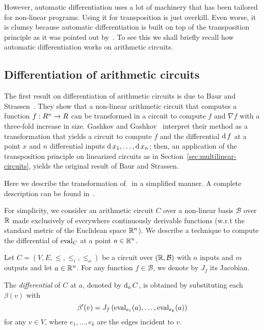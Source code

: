 However, automatic differentiation uses a lot of machinery that has
been tailored for non-linear programs. Using it for transposition is
just overkill. Even worse, it is clumsy because automatic
differentiation is built on top of the transposition principle as it
was pointed out by~\cite{gashkov+gashkov05}. To see this we shall
briefly recall how automatic differentiation works on arithmetic
circuits.

\subsection{Differentiation of arithmetic circuits}
\label{sec:diff-arithm-circ}
 The first
result on differentiation of arithmetic circuits is due to Baur and
Strassen~\cite{baur+strassen83}. They show that a non-linear
arithmetic circuit that computes a function $f:R^n\rightarrow R$ can be
transformed in a circuit to compute $f$ and $\nabla f$ with a
three-fold increase in size. Gashkov and
Gashkov~\cite{gashkov+gashkov05} interpret their method as a
transformation that yields a circuit to compute $f$ and the
differential $\operatorname{d} f$ at a point $x$ and $n$ differential inputs
$\operatorname{d} x_1,\ldots,\operatorname{d} x_n$; then, an application of the
transposition principle on linearized circuits as in
Section~\ref{sec:multilinear-circuits}, yields the original result of
Baur and Strassen.

Here we describe the transformation of~\cite{gashkov+gashkov05} in a
simplified manner. A complete description can be found
in~\cite{gashkov+gashkov05,sergeev08}.

For simplicity, we consider an arithmetic circuit $C$ over a
non-linear basis $\mathcal{B}$ over $\mathbb{R}$ made exclusively of
everywhere continuously derivable functions (w.r.t the standard metric
of the Euclidean space $\mathbb{R}^n$). We describe a technique to compute the
differential of $\operatorname{eval}_C$ at a point $a\in\mathbb{R}^n$.

\begin{definition}
  Let $C=(V,E,\le,\le_i,\le_o)$ be a circuit over $(\mathbb{R},\mathcal{B})$
  with $n$ inputs and $m$ outputs and let $a\in\mathbb{R}^n$. For any function
  $f\in\mathcal{B}$, we denote by $J_f$ its Jacobian. 

  The \emph{differential} of $C$ at $a$, denoted by $\operatorname{d}_a C$, is
  obtained by substituting each $\beta(v)$ with
  \begin{equation}
    \label{eq:derivative}
    \beta'(v)=J_f\left(\operatorname{eval}_{e_1}(a),\ldots,\operatorname{eval}_{e_k}(a)\right)
  \end{equation}
  for any $v\in V$, where $e_1,\ldots,e_k$ are the edges incident to
  $v$.
\end{definition}

